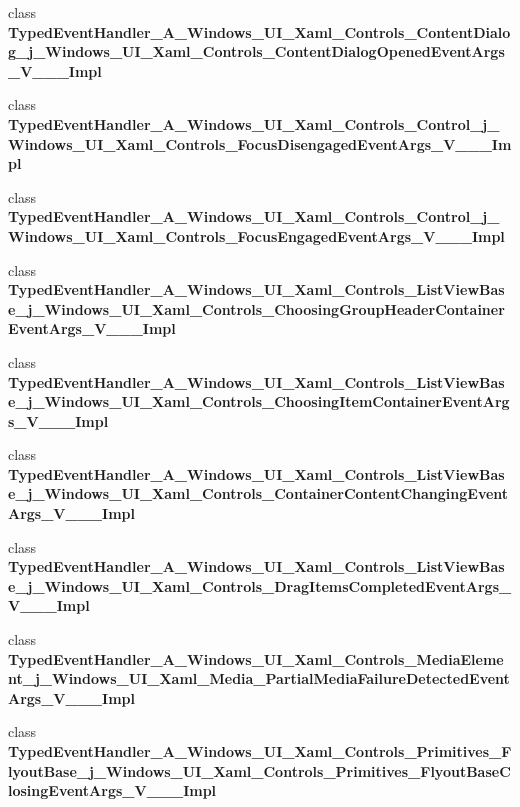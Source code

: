 \begin{DoxyCompactItemize}
\item 
class {\bfseries Typed\+Event\+Handler\+\_\+\+A\+\_\+\+Windows\+\_\+\+U\+I\+\_\+\+Xaml\+\_\+\+Controls\+\_\+\+Content\+Dialog\+\_\+j\+\_\+\+Windows\+\_\+\+U\+I\+\_\+\+Xaml\+\_\+\+Controls\+\_\+\+Content\+Dialog\+Opened\+Event\+Args\+\_\+\+V\+\_\+\+\_\+\+\_\+\+Impl}
\item 
class {\bfseries Typed\+Event\+Handler\+\_\+\+A\+\_\+\+Windows\+\_\+\+U\+I\+\_\+\+Xaml\+\_\+\+Controls\+\_\+\+Control\+\_\+j\+\_\+\+Windows\+\_\+\+U\+I\+\_\+\+Xaml\+\_\+\+Controls\+\_\+\+Focus\+Disengaged\+Event\+Args\+\_\+\+V\+\_\+\+\_\+\+\_\+\+Impl}
\item 
class {\bfseries Typed\+Event\+Handler\+\_\+\+A\+\_\+\+Windows\+\_\+\+U\+I\+\_\+\+Xaml\+\_\+\+Controls\+\_\+\+Control\+\_\+j\+\_\+\+Windows\+\_\+\+U\+I\+\_\+\+Xaml\+\_\+\+Controls\+\_\+\+Focus\+Engaged\+Event\+Args\+\_\+\+V\+\_\+\+\_\+\+\_\+\+Impl}
\item 
class {\bfseries Typed\+Event\+Handler\+\_\+\+A\+\_\+\+Windows\+\_\+\+U\+I\+\_\+\+Xaml\+\_\+\+Controls\+\_\+\+List\+View\+Base\+\_\+j\+\_\+\+Windows\+\_\+\+U\+I\+\_\+\+Xaml\+\_\+\+Controls\+\_\+\+Choosing\+Group\+Header\+Container\+Event\+Args\+\_\+\+V\+\_\+\+\_\+\+\_\+\+Impl}
\item 
class {\bfseries Typed\+Event\+Handler\+\_\+\+A\+\_\+\+Windows\+\_\+\+U\+I\+\_\+\+Xaml\+\_\+\+Controls\+\_\+\+List\+View\+Base\+\_\+j\+\_\+\+Windows\+\_\+\+U\+I\+\_\+\+Xaml\+\_\+\+Controls\+\_\+\+Choosing\+Item\+Container\+Event\+Args\+\_\+\+V\+\_\+\+\_\+\+\_\+\+Impl}
\item 
class {\bfseries Typed\+Event\+Handler\+\_\+\+A\+\_\+\+Windows\+\_\+\+U\+I\+\_\+\+Xaml\+\_\+\+Controls\+\_\+\+List\+View\+Base\+\_\+j\+\_\+\+Windows\+\_\+\+U\+I\+\_\+\+Xaml\+\_\+\+Controls\+\_\+\+Container\+Content\+Changing\+Event\+Args\+\_\+\+V\+\_\+\+\_\+\+\_\+\+Impl}
\item 
class {\bfseries Typed\+Event\+Handler\+\_\+\+A\+\_\+\+Windows\+\_\+\+U\+I\+\_\+\+Xaml\+\_\+\+Controls\+\_\+\+List\+View\+Base\+\_\+j\+\_\+\+Windows\+\_\+\+U\+I\+\_\+\+Xaml\+\_\+\+Controls\+\_\+\+Drag\+Items\+Completed\+Event\+Args\+\_\+\+V\+\_\+\+\_\+\+\_\+\+Impl}
\item 
class {\bfseries Typed\+Event\+Handler\+\_\+\+A\+\_\+\+Windows\+\_\+\+U\+I\+\_\+\+Xaml\+\_\+\+Controls\+\_\+\+Media\+Element\+\_\+j\+\_\+\+Windows\+\_\+\+U\+I\+\_\+\+Xaml\+\_\+\+Media\+\_\+\+Partial\+Media\+Failure\+Detected\+Event\+Args\+\_\+\+V\+\_\+\+\_\+\+\_\+\+Impl}
\item 
class {\bfseries Typed\+Event\+Handler\+\_\+\+A\+\_\+\+Windows\+\_\+\+U\+I\+\_\+\+Xaml\+\_\+\+Controls\+\_\+\+Primitives\+\_\+\+Flyout\+Base\+\_\+j\+\_\+\+Windows\+\_\+\+U\+I\+\_\+\+Xaml\+\_\+\+Controls\+\_\+\+Primitives\+\_\+\+Flyout\+Base\+Closing\+Event\+Args\+\_\+\+V\+\_\+\+\_\+\+\_\+\+Impl}

\end{DoxyCompactItemize}
